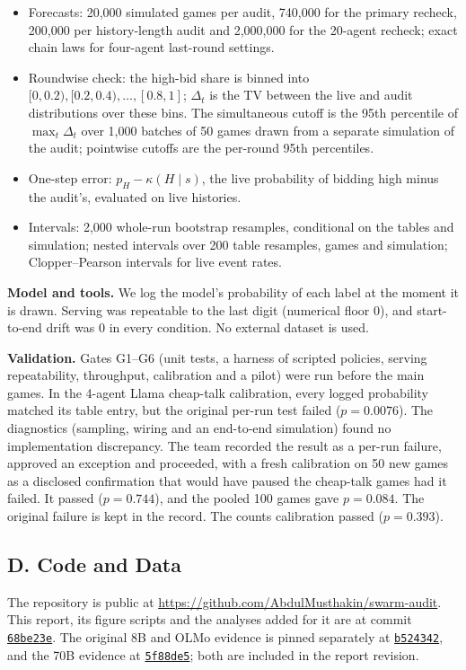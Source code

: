 \documentclass[11pt,letterpaper]{article}
\begin{document}
\begin{itemize}
  \item Forecasts: 20,000 simulated games per audit, 740,000 for the primary recheck, 200,000 per history-length audit and 2,000,000 for the 20-agent recheck; exact chain laws for four-agent last-round settings.
  \item Roundwise check: the high-bid share is binned into $[0, 0.2), [0.2, 0.4), \ldots, [0.8, 1]$; $\Delta_t$ is the TV between the live and audit distributions over these bins.
    The simultaneous cutoff is the 95th percentile of $\max_t \Delta_t$ over 1,000 batches of 50 games drawn from a separate simulation of the audit; pointwise cutoffs are the per-round 95th percentiles.
  \item One-step error: $p_H - \kappa(H \mid s)$, the live probability of bidding high minus the audit's, evaluated on live histories.
  \item Intervals: 2,000 whole-run bootstrap resamples, conditional on the tables and simulation; nested intervals over 200 table resamples, games and simulation; Clopper--Pearson intervals for live event rates.
\end{itemize}

\textbf{Model and tools.}
We log the model's probability of each label at the moment it is drawn.
Serving was repeatable to the last digit (numerical floor 0), and start-to-end drift was 0 in every condition.
No external dataset is used.

\textbf{Validation.}
Gates G1--G6 (unit tests, a harness of scripted policies, serving repeatability, throughput, calibration and a pilot) were run before the main games.
In the 4-agent Llama cheap-talk calibration, every logged probability matched its table entry, but the original per-run test failed ($p = 0.0076$).
The diagnostics (sampling, wiring and an end-to-end simulation) found no implementation discrepancy.
The team recorded the result as a per-run failure, approved an exception and proceeded, with a fresh calibration on 50 new games as a disclosed confirmation that would have paused the cheap-talk games had it failed.
It passed ($p = 0.744$), and the pooled 100 games gave $p = 0.084$.
The original failure is kept in the record.
The counts calibration passed ($p = 0.393$).

\subsection{D. Code and Data}

The repository is public at \url{https://github.com/AbdulMusthakin/swarm-audit}.
This report, its figure scripts and the analyses added for it are at commit \href{https://github.com/AbdulMusthakin/swarm-audit/tree/68be23ec4092a9070f0bee207f5ae724831ac240}{\texttt{68be23e}}. The original 8B and OLMo evidence is pinned separately at \href{https://github.com/AbdulMusthakin/swarm-audit/tree/b52434290039a1bc775137271a38ee35c06d432c}{\texttt{b524342}}, and the 70B evidence at \href{https://github.com/AbdulMusthakin/swarm-audit/tree/5f88de5bc83acfab90a01a78f696849421523f5c}{\texttt{5f88de5}}; both are included in the report revision.
\end{document}
